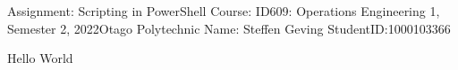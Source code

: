 \documentclass{article}
\begin{document}
  \begin{titlepage}
    Assignment: Scripting in PowerShell
    Course: ID609: Operations Engineering 1, Semester 2, 2022Otago Polytechnic
    Name: Steffen Geving
    StudentID:1000103366    
  \end{titlepage}

  Hello World
\end{document}
